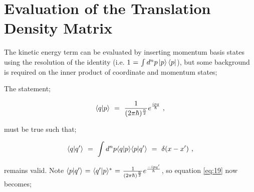 \documentclass{ece}
\begin{document}

\appendix

\section{Evaluation of the Translation Density Matrix}
\label{app:firstappx}

The kinetic energy term can be evaluated by inserting momentum basis states using the resolution of the identity (i.e. \begin{math} 1 \hspace{0.025cm} = \hspace{0.025cm} \int d^n p \ket{p} \bra{p} \end{math}), but some background is required on the inner product of coordinate and momentum states;

The statement;

\begin{equation} \label{eq:18}
\langle q | p \rangle \hspace{0.125cm} = \hspace{0.125cm} \frac{1}{(2 \pi \hbar)^{\frac{n}{2}}} e^{\frac{i p q}{\hbar}} \hspace{0.125cm} , 
\end{equation}

must be true such that;

\begin{equation} \label{eq:19}
\langle q | q' \rangle \hspace{0.125cm} = \hspace{0.125cm} \int d^n p \langle q | p \rangle \langle p | q' \rangle \hspace{0.125cm} = \hspace{0.125cm} \delta ( x - x' )  \hspace{0.125cm} , 
\end{equation}

remains valid. Note \begin{math} \langle p | q' \rangle  \hspace{0.025cm} = \hspace{0.025cm} \langle q' | p \rangle^{*} \hspace{0.025cm} = \hspace{0.025cm} \frac{1}{(2 \pi \hbar)^{\frac{n}{2}}} e^{\frac{- i p q'}{\hbar}}  \end{math}, so  equation \ref{eq:19} now becomes;
\end{document}

